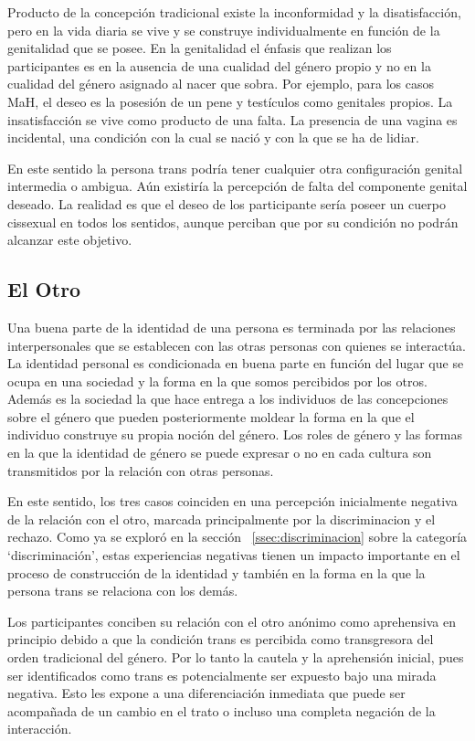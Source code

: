  Producto de la concepción tradicional existe la inconformidad y la
 disatisfacción, pero en la vida diaria se vive y se construye individualmente
 en función de la genitalidad que se posee. En la genitalidad el énfasis que
 realizan los participantes es en la ausencia de una cualidad del género propio
 y no en la cualidad del género asignado al nacer que sobra. Por ejemplo, para
 los casos MaH, el deseo es la posesión de un pene y testículos como genitales
 propios. La insatisfacción se vive como producto de una falta. La presencia de
 una vagina es incidental, una condición con la cual se nació y con la que se ha
 de lidiar.

 En este sentido la persona trans podría tener cualquier otra configuración
 genital intermedia o ambigua. Aún existiría la percepción de falta del
 componente genital deseado. La realidad es que el deseo de los participante
 sería poseer un cuerpo cissexual en todos los sentidos, aunque perciban que por
 su condición no podrán alcanzar este objetivo.

\subsection{El Otro}

Una buena parte de la identidad de una persona es terminada por las relaciones
interpersonales que se establecen con las otras personas con quienes se
interactúa. La identidad personal es condicionada en buena parte en función del
lugar que se ocupa en una sociedad y la forma en la que somos percibidos por los
otros. Además es la sociedad la que hace entrega a los individuos de las
concepciones sobre el género que pueden posteriormente moldear la forma en la
que el individuo construye su propia noción del género. Los roles de género y
las formas en la que la identidad de género se puede expresar o no en cada
cultura son transmitidos por la relación con otras personas.

En este sentido, los tres casos coinciden en una percepción inicialmente
negativa de la relación con el otro, marcada principalmente por la
discriminacion y el rechazo. Como ya se exploró en la sección
~\ref{ssec:discriminacion} sobre la categoría ‘discriminación’, estas
experiencias negativas tienen un impacto importante en el proceso de
construcción de la identidad y también en la forma en la que la persona trans se
relaciona con los demás.

Los participantes conciben su relación con el otro anónimo como aprehensiva en
principio debido a que la condición trans es percibida como transgresora del
orden tradicional del género. Por lo tanto la cautela y la aprehensión inicial,
pues ser identificados como trans es potencialmente ser expuesto bajo una mirada
negativa. Esto les expone a una diferenciación inmediata que puede ser
acompañada de un cambio en el trato o incluso una completa negación de la
interacción.

